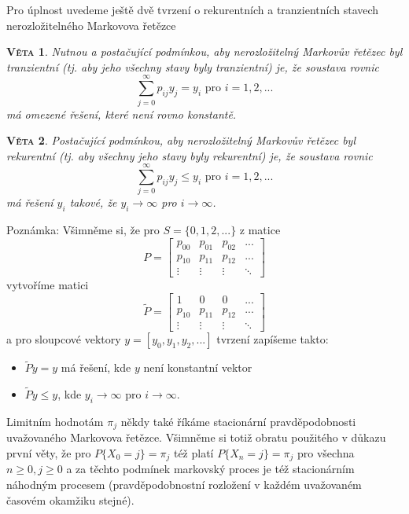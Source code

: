 \documentclass[10pt]{article}
\newtheorem{proposition}{\textsc{Věta}}
\begin{document}
Pro úplnost uvedeme ještě dvě tvrzení o rekurentních a tranzientních stavech nerozložitelného Markovova řetězce
\begin{proposition}
Nutnou a postačující podmínkou, aby nerozložitelný Markovův řetězec byl tranzientní (tj. aby jeho všechny stavy byly tranzientní) je, že soustava rovnic $$\sum_{j=0}^{\infty} p_{ij} y_j = y_i \text{ pro }i=1,2,...$$ má omezené řešení, které není rovno konstantě.
\end{proposition}

\begin{proposition}
Postačující podmínkou, aby nerozložitelný Markovův řetězec byl rekurentní (tj. aby všechny jeho stavy byly rekurentní) je, že soustava rovnic $$\sum_{j=0}^{\infty} p_{ij} y_j \leq y_i \text{ pro }i=1,2,...$$ má řešení $y_i$ takové, že $y_i \to \infty$ pro $i \to \infty$.
\end{proposition}

Poznámka: Všimněme si, že pro $S=\{0,1,2,...\}$ z matice $$P= \begin{bmatrix}
p_{00}&p_{01}&p_{02}&...\\
p_{10}&p_{11}&p_{12}&...\\
\vdots&\vdots&\vdots&\ddots
\end{bmatrix}$$ vytvoříme matici $$\tilde{P}= \begin{bmatrix}
1&0&0&...\\
p_{10}&p_{11}&p_{12}&...\\
\vdots&\vdots&\vdots&\ddots
\end{bmatrix}$$ a pro sloupcové vektory $y = [y_0,y_1,y_2,...]$ tvrzení zapíšeme takto: 
\begin{itemize}
\item $\tilde{P} y = y$ má řešení, kde $y$ není konstantní vektor
\item $\tilde{P}y \leq y$, kde $y_i \to \infty$ pro $i \to \infty$.
\end{itemize}

Limitním hodnotám $\pi_j$ někdy také říkáme stacionární pravděpodobnosti uvažovaného Markovova řetězce. Všimněme si totiž obratu použitého v důkazu první věty, že pro $P\{X_0=j\}=\pi_j$ též platí $P\{X_n=j\}=\pi_j$ pro všechna $n \geq 0, j \geq 0$ a za těchto podmínek markovský proces je též stacionárním náhodným procesem (pravděpodobnostní rozložení v každém uvažovaném časovém okamžiku stejné).
\end{document}
